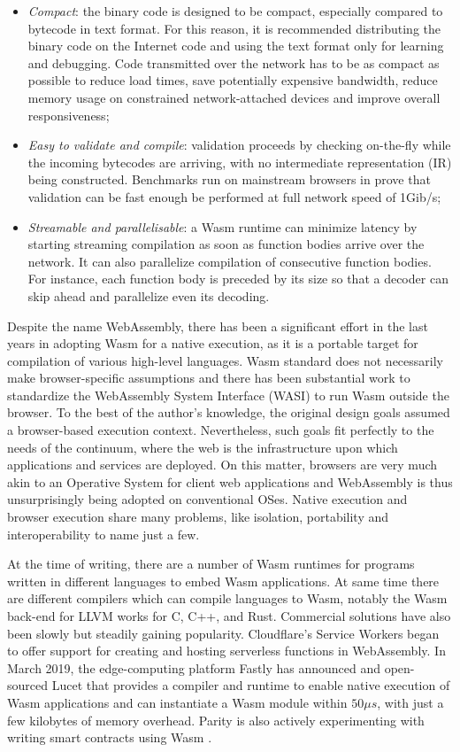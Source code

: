 \begin{itemize}
    \item \emph{Compact}: the binary code is designed to be compact, especially compared to bytecode in text format. For this reason, it is recommended distributing the binary code on the Internet code and using the text format only for learning and debugging. Code transmitted over the network has to be as compact as possible to reduce load times, save potentially expensive bandwidth, reduce memory usage on constrained network-attached devices and improve overall responsiveness;
    \item \emph{Easy to validate and compile}: validation proceeds by checking on-the-fly while the incoming bytecodes are arriving, with no intermediate representation (IR) being constructed. Benchmarks run on mainstream browsers in \cite{wasm} prove that validation can be fast enough be performed at full network speed of 1Gib/s;
    \item \emph{Streamable and parallelisable}: a Wasm runtime can minimize latency by starting streaming compilation as soon as function bodies arrive over the network. It can also parallelize compilation of consecutive function bodies. For instance, each function body is preceded by its size so that a decoder can skip ahead and parallelize even its decoding.
\end{itemize}

Despite the name WebAssembly, there has been a significant effort in the last years in adopting Wasm for a native execution, as it is a portable target for compilation of various high-level languages. Wasm standard does not necessarily make browser-specific assumptions and there has been substantial work to standardize the WebAssembly System Interface (WASI) to run Wasm outside the browser. To the best of the author's knowledge, the original design goals assumed a browser-based execution context. Nevertheless, such goals fit perfectly to the needs of the continuum, where the web is the infrastructure upon which applications and services are deployed. On this matter, browsers are very much akin to an Operative System for client web applications and WebAssembly is thus unsurprisingly being adopted on conventional OSes. Native execution and browser execution share many problems, like isolation, portability and interoperability to name just a few.

At the time of writing, there are a number of Wasm runtimes for programs written in different languages to embed Wasm applications. At same time there are different compilers which can compile languages to Wasm, notably the Wasm back-end for LLVM \cite{llvm} works for C, C++, and Rust. Commercial solutions have also been slowly but steadily gaining popularity. Cloudflare's Service Workers \cite{cloudflare-workers} began to offer support for creating and hosting serverless functions in WebAssembly. In March 2019, the edge-computing platform Fastly has announced and open-sourced Lucet \cite{fastly-lucet} that provides a compiler and runtime to enable native execution of Wasm applications and can instantiate a Wasm module within $50\mu s$, with just a few kilobytes of memory overhead. Parity is also actively experimenting with writing smart contracts using Wasm \cite{parity-wasm}.

